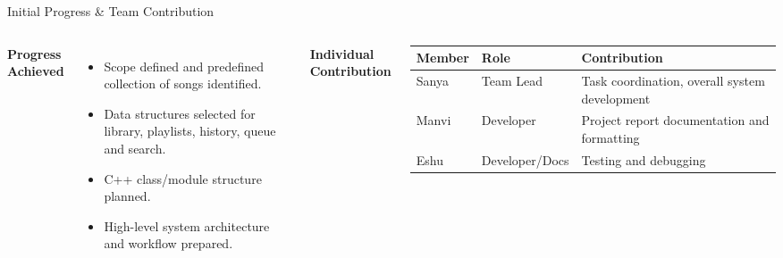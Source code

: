 \documentclass[aspectratio=169,11pt]{beamer}
\begin{document}
\begin{frame}{Initial Progress \& Team Contribution}

\begin{columns}[T,totalwidth=\textwidth]

\textbf{\color{GEUBlue}Progress Achieved}
\begin{itemize}\itemsep4pt
\item Scope defined and predefined collection of songs identified.
\item Data structures selected for library, playlists, history, queue and search.
\item C++ class/module structure planned.
\item High-level system architecture and workflow prepared.
\end{itemize}

\textbf{\color{GEUBlue}Individual Contribution}
\vspace{2mm}

\scriptsize
\begin{tabularx}{\textwidth}{@{}p{1.65cm}p{2.15cm}X@{}}
\toprule
Member & Role & Contribution\\
\midrule
Sanya & Team Lead &
Task coordination, overall system development\\
Manvi & Developer &
Project report documentation and formatting\\
Eshu & Developer/Docs &
Testing and debugging\\
\bottomrule
\end{tabularx}

\end{columns}
\end{frame}
\end{document}
